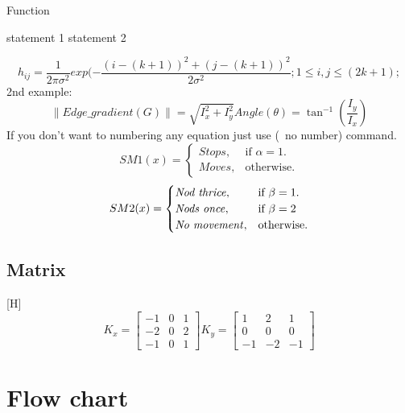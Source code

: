\begin{algorithm}
\caption{Function}
  \begin{algorithmic}[1]
      \State statement 1
      \State statement 2    
    \EndFunction
  \end{algorithmic}
\end{algorithm}

\begin{equation}
  h_{ij}= \dfrac{1}{2\pi\sigma^2} exp (-\dfrac{(i-(k+1))^2+(j-(k+1))^2}{2\sigma^2}; 1\le i, j\le (2k+1);
    \end{equation}
    2nd example:
    \begin{equation}
    \|Edge\_gradient(G)\|= \sqrt{I_x^2+I_y^2}
    Angle(\theta)= \tan^{-1}(\frac{I_y}{I_x})
\end{equation}
If you don't want to numbering any equation just use (\ no number) command.
\begin{equation}[H]
  SM1(x)=\begin{cases}
    Stops, & \text{if $\alpha=1$}.\\
    Moves, & \text{otherwise}.
  \end{cases}
  \nonumber
\end{equation}
\begin{equation}
  SM2(x)=\begin{cases}
  \mbox{\textit{Nod thrice}}, & \text{if $\beta=1$}.\\
   \mbox{\textit{Nods once}}, & \text{if $\beta=2$}\\
    \mbox{\textit{No movement}}, & \text{otherwise}.
  \end{cases}
  \nonumber
\end{equation}
\subsection{Matrix}[H]
 $$
 K_x=\begin{bmatrix} 
-1 & 0 & 1 \\
-2 & 0 & 2\\
-1 & 0 & 1
\end{bmatrix}
 K_y=\begin{bmatrix}
1 & 2 & 1 \\
0 & 0 & 0\\
-1 & -2 & -1
\end{bmatrix}
$$
\section{Flow chart}
